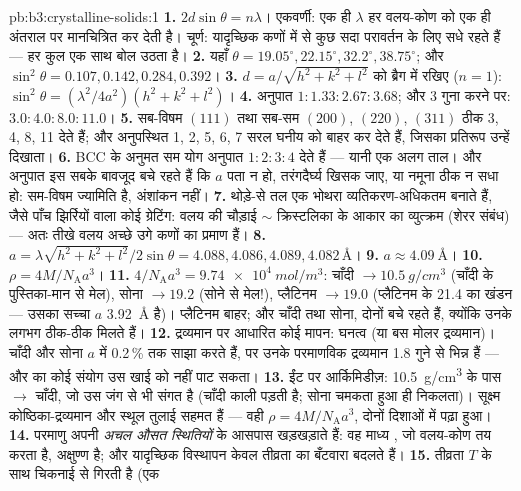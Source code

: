 \begin{solution}{pb:b3:crystalline-solids:1}
\textbf{1.} $2d\sin\theta = n\lambda$। एकवर्णी: एक ही
$\lambda$ हर वलय-कोण को एक ही अंतराल पर मानचित्रित कर देती है। चूर्ण:
यादृच्छिक कणों में से कुछ सदा परावर्तन के लिए सधे रहते हैं --- हर
कुल एक साथ बोल उठता है।
\textbf{2.} यहाँ $\theta = 19.05^\circ, 22.15^\circ, 32.2^\circ,
38.75^\circ$; और $\sin^2\theta = 0.107, 0.142, 0.284, 0.392$।
\textbf{3.} $d = a/\sqrt{h^2+k^2+l^2}$ को ब्रैग में रखिए
($n = 1$): $\sin^2\theta = (\lambda^2/4a^2)(h^2+k^2+l^2)$।
\textbf{4.} अनुपात $1 : 1.33 : 2.67 : 3.68$; और 3 गुना करने पर:
$3.0 : 4.0 : 8.0 : 11.0$।
\textbf{5.} सब-विषम $(111)$ तथा सब-सम $(200)$, $(220)$,
$(311)$ ठीक 3, 4, 8, 11 देते हैं; और अनुपस्थित 1, 2, 5, 6, 7 सरल
घनीय को बाहर कर देते हैं, जिसका प्रतिरूप उन्हें दिखाता।
\textbf{6.} BCC के अनुमत सम योग अनुपात
$1:2:3:4$ देते हैं --- यानी एक अलग ताल। और अनुपात इस सबके बावजूद
बचे रहते हैं कि $a$ पता न हो, तरंगदैर्घ्य खिसक जाए, या नमूना ठीक न
सधा हो: सम-विषम ज्यामिति है, अंशांकन नहीं।
\textbf{7.} थोड़े-से तल एक भोथरा व्यतिकरण-अधिकतम बनाते हैं, जैसे
पाँच झिर्रियों वाला कोई ग्रेटिंग: वलय की चौड़ाई $\sim$ क्रिस्टलिका के
आकार का व्युत्क्रम (शेरर संबंध) --- अतः तीखे वलय अच्छे उगे कणों का
प्रमाण हैं।
\textbf{8.} $a = \lambda\sqrt{h^2+k^2+l^2}/2\sin\theta = 4.088,
4.086, 4.089, 4.082\,\unit{\angstrom}$।
\textbf{9.} $a \approx \qty{4.09}{\angstrom}$।
\textbf{10.} $\rho = 4M/N_{\text{A}}a^3$।
\textbf{11.} $4/N_{\text{A}}a^3 = \qty{9.74e4}{mol/m^3}$:
चाँदी $\to \qty{10.5}{g/cm^3}$ (चाँदी के पुस्तिका-मान से मेल),
सोना $\to 19.2$ (सोने से मेल!), प्लैटिनम $\to 19.0$
(प्लैटिनम के 21.4 का खंडन --- उसका सच्चा $a$
\qty{3.92}{\angstrom} है)। प्लैटिनम बाहर; और चाँदी तथा सोना, दोनों
बचे रहते हैं, क्योंकि उनके  लगभग ठीक-ठीक मिलते हैं।
\textbf{12.} द्रव्यमान पर आधारित कोई मापन: घनत्व (या बस मोलर
द्रव्यमान)। चाँदी और सोना $a$ में 0.2\,\% तक साझा करते हैं, पर उनके
परमाणविक द्रव्यमान 1.8 गुने से भिन्न हैं --- और  का कोई संयोग उस
खाई को नहीं पाट सकता।
\textbf{13.} ईंट पर आर्किमिडीज़: \qty{10.5}{g/cm^3} के पास
$\to$ चाँदी, जो उस जंग से भी संगत है (चाँदी काली पड़ती है; सोना
चमकता हुआ ही निकलता)। सूक्ष्म कोष्ठिका-द्रव्यमान और स्थूल तुलाई
सहमत हैं --- वही
$\rho = 4M/N_{\text{A}}a^3$, दोनों दिशाओं में पढ़ा हुआ।
\textbf{14.} परमाणु अपनी \emph{अचल औसत स्थितियों} के आसपास
खड़खड़ाते हैं: वह माध्य , जो वलय-कोण तय करता है, अक्षुण्ण है;
और यादृच्छिक विस्थापन केवल तीव्रता का बँटवारा बदलते हैं।
\textbf{15.} तीव्रता $T$ के साथ चिकनाई से गिरती है (एक

\end{solution}

